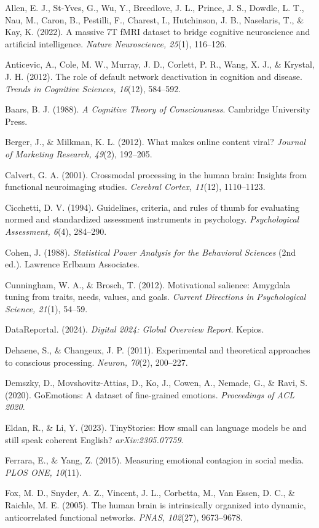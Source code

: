 \documentclass[11pt,letterpaper]{article}
\begin{document}
Allen, E. J., St-Yves, G., Wu, Y., Breedlove, J. L., Prince, J. S., Dowdle, L. T., Nau, M., Caron, B., Pestilli, F., Charest, I., Hutchinson, J. B., Naselaris, T., \& Kay, K. (2022). A massive 7T fMRI dataset to bridge cognitive neuroscience and artificial intelligence. \textit{Nature Neuroscience, 25}(1), 116--126.

Anticevic, A., Cole, M. W., Murray, J. D., Corlett, P. R., Wang, X. J., \& Krystal, J. H. (2012). The role of default network deactivation in cognition and disease. \textit{Trends in Cognitive Sciences, 16}(12), 584--592.

Baars, B. J. (1988). \textit{A Cognitive Theory of Consciousness}. Cambridge University Press.

Berger, J., \& Milkman, K. L. (2012). What makes online content viral? \textit{Journal of Marketing Research, 49}(2), 192--205.

Calvert, G. A. (2001). Crossmodal processing in the human brain: Insights from functional neuroimaging studies. \textit{Cerebral Cortex, 11}(12), 1110--1123.

Cicchetti, D. V. (1994). Guidelines, criteria, and rules of thumb for evaluating normed and standardized assessment instruments in psychology. \textit{Psychological Assessment, 6}(4), 284--290.

Cohen, J. (1988). \textit{Statistical Power Analysis for the Behavioral Sciences} (2nd ed.). Lawrence Erlbaum Associates.

Cunningham, W. A., \& Brosch, T. (2012). Motivational salience: Amygdala tuning from traits, needs, values, and goals. \textit{Current Directions in Psychological Science, 21}(1), 54--59.

DataReportal. (2024). \textit{Digital 2024: Global Overview Report}. Kepios.

Dehaene, S., \& Changeux, J. P. (2011). Experimental and theoretical approaches to conscious processing. \textit{Neuron, 70}(2), 200--227.

Demszky, D., Movshovitz-Attias, D., Ko, J., Cowen, A., Nemade, G., \& Ravi, S. (2020). GoEmotions: A dataset of fine-grained emotions. \textit{Proceedings of ACL 2020}.

Eldan, R., \& Li, Y. (2023). TinyStories: How small can language models be and still speak coherent English? \textit{arXiv:2305.07759}.

Ferrara, E., \& Yang, Z. (2015). Measuring emotional contagion in social media. \textit{PLOS ONE, 10}(11).

Fox, M. D., Snyder, A. Z., Vincent, J. L., Corbetta, M., Van Essen, D. C., \& Raichle, M. E. (2005). The human brain is intrinsically organized into dynamic, anticorrelated functional networks. \textit{PNAS, 102}(27), 9673--9678.
\end{document}

